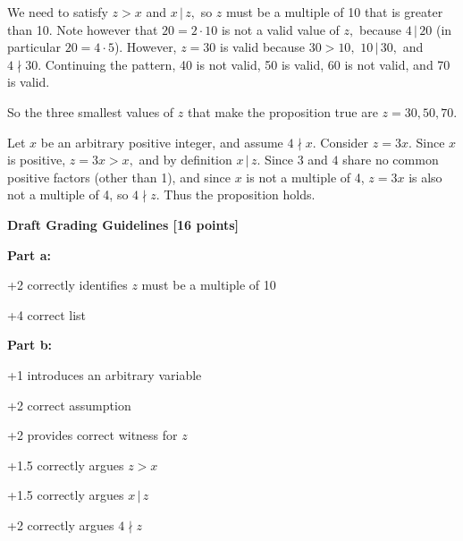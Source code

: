 \documentclass[12pt]{exam}
\newcommand{\divides}{\,|\,}
\begin{document}
\begin{solution}
    \begin{qparts}
        \item We need to satisfy $z>x$ and $x\,|\,z,$ so $z$ must be a multiple of 10 that is greater than 10. Note however that $20=2\cdot 10$ is not a valid value of $z,$ because $4\,|\,20$ (in particular $20=4\cdot 5$). However, $z=30$ is valid because $30>10,$ $10\,|\,30,$ and $4\nmid 30.$ Continuing the pattern, 40 is not valid, 50 is valid, 60 is not valid, and 70 is valid.

        So the three smallest values of $z$ that make the proposition true are $z=30,50,70.$

        \item Let $x$ be an arbitrary positive integer, and assume $4\nmid x.$ Consider $z=3x.$ Since $x$ is positive, $z=3x>x,$ and by definition $x\,|\, z.$ Since $3$ and $4$ share no common positive factors (other than 1), and since $x$ is not a multiple of 4, $z=3x$ is also not a multiple of 4, so $4\nmid z.$ Thus the proposition holds.
    \end{qparts}

    \smallskip
    \textbf{Draft Grading Guidelines [16 points]}

    \textbf{Part a:}
    \begin{guidelines}
        \item +2 correctly identifies $z$ must be a multiple of 10
        \item +4 correct list
    \end{guidelines}
    \textbf{Part b:}
    \begin{guidelines}
        \item +1 introduces an arbitrary variable
        \item +2 correct assumption
        \item +2 provides correct witness for $z$
        \item +1.5 correctly argues $z>x$
        \item +1.5 correctly argues $x\divides z$
        \item +2 correctly argues $4\nmid z$
    \end{guidelines}
\end{solution}



\pagebreak
\end{document}
